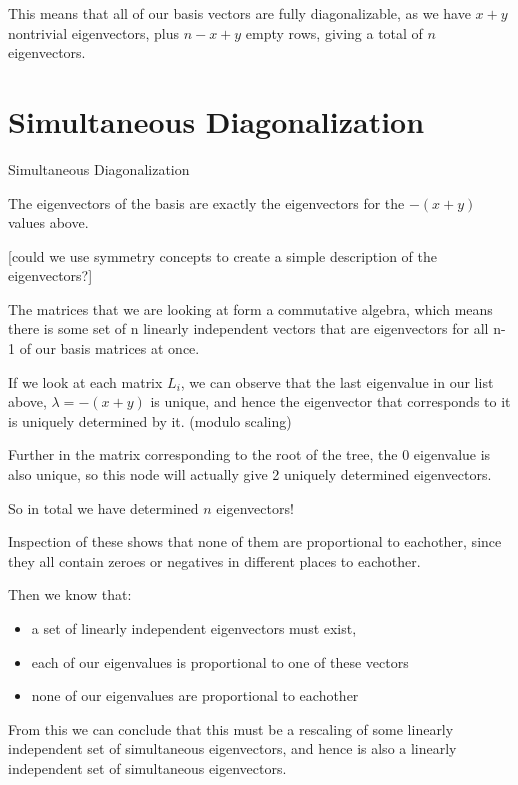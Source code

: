 \documentclass[10pt,a4paper]{report}
\begin{document}
This means that all of our basis vectors are fully diagonalizable, as we have
$x+y$ nontrivial eigenvectors, plus $n-x+y$ empty rows, giving a total of $n$
eigenvectors.

\section{Simultaneous Diagonalization}

\begin{theorem-wip} Simultaneous Diagonalization

	The eigenvectors of the basis are exactly the eigenvectors for the $-(x+y)$ values above.

	[could we use symmetry concepts to create a simple description of the eigenvectors?]
\end{theorem-wip}

The matrices that we are looking at form a commutative algebra, which means
there is some set of n linearly independent vectors that are eigenvectors for
all n-1 of our basis matrices at once.

If we look at each matrix $L_i$, we can observe that the last eigenvalue in our
list above, $\lambda = -(x + y)$ is unique, and hence the eigenvector that
corresponds to it is uniquely determined by it. (modulo scaling)

Further in the matrix corresponding to the root of the tree, the $0$ eigenvalue
is also unique, so this node will actually give 2 uniquely determined
eigenvectors.

So in total we have determined $n$ eigenvectors!

Inspection of these shows that none of them are proportional to eachother,
since they all contain zeroes or negatives in different places to eachother.

Then we know that:
\begin{itemize}
	\item a set of linearly independent eigenvectors must exist,
	\item each of our eigenvalues is proportional to one of these vectors
	\item none of our eigenvalues are proportional to eachother
\end{itemize}
From this we can conclude that this must be a rescaling of some linearly
independent set of simultaneous eigenvectors, and hence is also a linearly
independent set of simultaneous eigenvectors.
\end{document}
